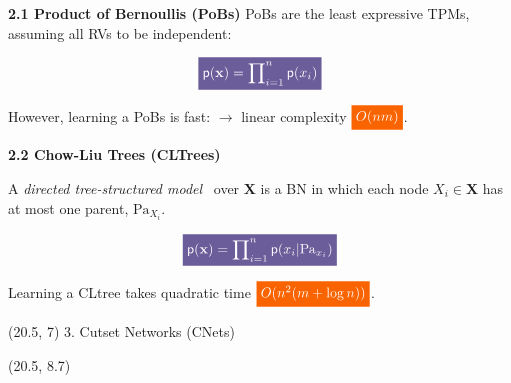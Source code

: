\documentclass[final]{beamer}
\newcommand{\highlight}[2][yellow]{\mathchoice%
  {\colorbox{#1}{\strut\textcolor{white}{$\displaystyle{#2}$}}}%
  {\colorbox{#1}{\strut\textcolor{white}{$\textstyle{#2}$}}}%
  {\colorbox{#1}{\strut\textcolor{white}{$\scriptstyle{#2}$}}}%
  {\colorbox{#1}{\strut\textcolor{white}{$\scriptscriptstyle{#2}$}}}}%
\begin{document}
\begin{frame}{}
\begin{textblock}{17.5}
    
    {\bf 2.1 Product of Bernoullis (PoBs)}
    \textsf{PoBs} are the least expressive TPMs, assuming all RVs to be independent:
    
    $$\highlight[lacamlilac]{\mathsf{p}(\mathbf{x}) =\prod\nolimits_{i=1}^{n}\mathsf{p}(x_{i})}$$

    However, learning a \textsf{PoBs} is fast: $\rightarrow$ linear complexity $\highlight[gold4]{O(nm)}$.\par
    \vspace{30pt}

    {\bf 2.2 Chow-Liu Trees (CLTrees)}

    A \emph{directed tree-structured model}~\cite{Meila2000} over
    $\mathbf{X}$ is a BN in which each node $X_{i}\in\mathbf{X}$ has at most one
    parent, $\mathrm{Pa}_{X_i}$.

    $$\highlight[lacamlilac]{\mathsf{p}(\mathbf{x}) =
    \prod\nolimits_{i=1}^n\mathsf{p}(x_i|\mathrm{Pa}_{x_i})}$$

    Learning a \textsf{CLtree} takes  quadratic time $\highlight[gold4]{O(n^2(m + \log n))}$.\par
  \end{textblock}

  

  \begin{textblock}{17.5}(20.5, 7)
    3. Cutset Networks (CNets)
  \end{textblock}
  
  \begin{textblock}{17.5}(20.5, 8.7)
    \small


\end{textblock}
\end{frame}
\end{document}
